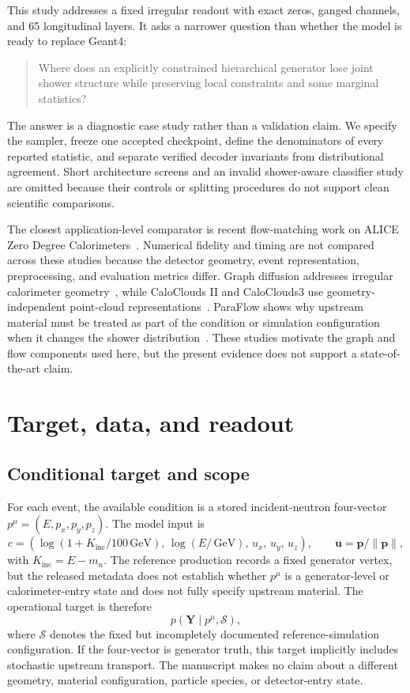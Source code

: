 \documentclass[11pt]{article}
\newcommand{\GeV}{\,\mathrm{GeV}}
\newcommand{\Kinc}{K_{\mathrm{inc}}}
\newcommand{\Y}{\mathbf{Y}}
\begin{document}
This study addresses a fixed irregular readout with exact zeros, ganged channels, and 65 longitudinal layers. It asks a narrower question than whether the model is ready to replace Geant4:
\begin{quote}
Where does an explicitly constrained hierarchical generator lose joint shower structure while preserving local constraints and some marginal statistics?
\end{quote}
The answer is a diagnostic case study rather than a validation claim. We specify the sampler, freeze one accepted checkpoint, define the denominators of every reported statistic, and separate verified decoder invariants from distributional agreement. Short architecture screens and an invalid shower-aware classifier study are omitted because their controls or splitting procedures do not support clean scientific comparisons.

The closest application-level comparator is recent flow-matching work on ALICE Zero Degree Calorimeters~\cite{fasterzdc}. Numerical fidelity and timing are not compared across these studies because the detector geometry, event representation, preprocessing, and evaluation metrics differ. Graph diffusion addresses irregular calorimeter geometry~\cite{calograph}, while CaloClouds II and CaloClouds3 use geometry-independent point-cloud representations~\cite{caloclouds2,caloclouds3}. ParaFlow shows why upstream material must be treated as part of the condition or simulation configuration when it changes the shower distribution~\cite{paraflow}. These studies motivate the graph and flow components used here, but the present evidence does not support a state-of-the-art claim.

\section{Target, data, and readout}
\label{sec:data}

\subsection{Conditional target and scope}

For each event, the available condition is a stored incident-neutron four-vector $p^\mu=(E,p_x,p_y,p_z)$. The model input is
\begin{equation}
 c=\left(\log(1+\Kinc/100\GeV),\,\log(E/\GeV),\,u_x,\,u_y,\,u_z\right),
 \qquad \mathbf u=\mathbf p/\lVert\mathbf p\rVert ,
\end{equation}
with $\Kinc=E-m_n$. The reference production records a fixed generator vertex, but the released metadata does not establish whether $p^\mu$ is a generator-level or calorimeter-entry state and does not fully specify upstream material. The operational target is therefore
\begin{equation}
 p(\Y\mid p^\mu,\mathcal S),
\end{equation}
where $\mathcal S$ denotes the fixed but incompletely documented reference-simulation configuration. If the four-vector is generator truth, this target implicitly includes stochastic upstream transport. The manuscript makes no claim about a different geometry, material configuration, particle species, or detector-entry state.
\end{document}
